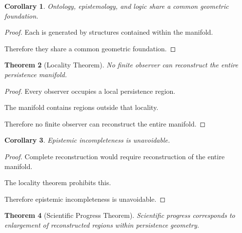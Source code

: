 \documentclass[12pt,oneside]{article}
\newtheorem{theorem}{Theorem}[section] \newtheorem{lemma}[theorem]{Lemma} \newtheorem{proposition}[theorem]{Proposition} \newtheorem{corollary}[theorem]{Corollary}
\theoremstyle{definition}
\begin{document}
\begin{corollary}

Ontology, epistemology, and logic share a common geometric foundation.

\end{corollary}

\begin{proof}

Each is generated by structures contained within the manifold.

Therefore they share a common geometric foundation.

\end{proof}

\begin{theorem}[Locality Theorem]

No finite observer can reconstruct the entire persistence manifold.

\end{theorem}

\begin{proof}

Every observer occupies a local persistence region.

The manifold contains regions outside that locality.

Therefore no finite observer can reconstruct the entire manifold.

\end{proof}

\begin{corollary}

Epistemic incompleteness is unavoidable.

\end{corollary}

\begin{proof}

Complete reconstruction would require reconstruction of the entire manifold.

The locality theorem prohibits this.

Therefore epistemic incompleteness is unavoidable.

\end{proof}

\begin{theorem}[Scientific Progress Theorem]

Scientific progress corresponds to enlargement of reconstructed regions within persistence geometry.

\end{theorem}
\end{document}
